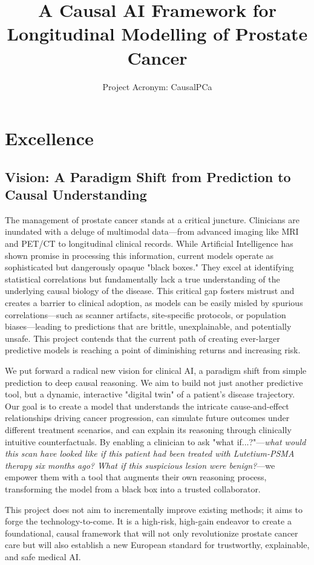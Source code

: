 \documentclass[11pt, a4paper]{article}
\title{A Causal AI Framework for Longitudinal Modelling of Prostate Cancer}
\author{Project Acronym: CausalPCa}
\date{}
\begin{document}
\maketitle

\section{Excellence}

\subsection{Vision: A Paradigm Shift from Prediction to Causal Understanding}
The management of prostate cancer stands at a critical juncture. Clinicians are inundated with a deluge of multimodal data—from advanced imaging like MRI and PET/CT to longitudinal clinical records. While Artificial Intelligence has shown promise in processing this information, current models operate as sophisticated but dangerously opaque "black boxes." They excel at identifying statistical correlations but fundamentally lack a true understanding of the underlying causal biology of the disease. This critical gap fosters mistrust and creates a barrier to clinical adoption, as models can be easily misled by spurious correlations—such as scanner artifacts, site-specific protocols, or population biases—leading to predictions that are brittle, unexplainable, and potentially unsafe. This project contends that the current path of creating ever-larger predictive models is reaching a point of diminishing returns and increasing risk.

We put forward a radical new vision for clinical AI, a paradigm shift from simple prediction to deep causal reasoning. We aim to build not just another predictive tool, but a dynamic, interactive "digital twin" of a patient's disease trajectory. Our goal is to create a model that understands the intricate cause-and-effect relationships driving cancer progression, can simulate future outcomes under different treatment scenarios, and can explain its reasoning through clinically intuitive counterfactuals. By enabling a clinician to ask "what if...?"—\textit{what would this scan have looked like if this patient had been treated with Lutetium-PSMA therapy six months ago? What if this suspicious lesion were benign?}—we empower them with a tool that augments their own reasoning process, transforming the model from a black box into a trusted collaborator.

This project does not aim to incrementally improve existing methods; it aims to forge the technology-to-come. It is a high-risk, high-gain endeavor to create a foundational, causal framework that will not only revolutionize prostate cancer care but will also establish a new European standard for trustworthy, explainable, and safe medical AI.
\end{document}
